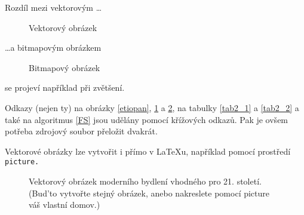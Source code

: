 \documentclass[a4paper,11pt]{article}
\begin{document}
Rozdíl mezi vektorovým \dots

\begin{figure}[h]
    \centering
    \caption{Vektorový obrázek}
    \label{oniisan}
\end{figure}

\dots a bitmapovým obrázkem

\begin{figure}[h]
    \centering
    \caption{Bitmapový obrázek}
    \label{oniisan2}
\end{figure}

\noindent
se projeví například při zvětšení. \par
Odkazy (nejen ty) na obrázky \ref{etiopan}, \ref{oniisan} a \ref{oniisan2}, na tabulky \ref{tab2_1} a \ref{tab2_2} a také na algoritmus \ref{FS} jsou udělány pomocí křížových odkazů. Pak je ovšem potřeba zdrojový soubor přeložit dvakrát. \par
Vektorové obrázky lze vytvořit i přímo v \LaTeX{u}, například pomocí prostředí \texttt{picture.}

\newpage

\begin{landscape}
    \begin{figure}[ht]
        \centering
        \setlength{\unitlength}{1mm}
    \caption{Vektorový obrázek moderního bydlení vhodného pro 21. století. (Bud’to vytvořte stejný obrázek, anebo nakreslete pomocí picture váš vlastní domov.)}
    \end{figure}
\end{landscape}
\end{document}
